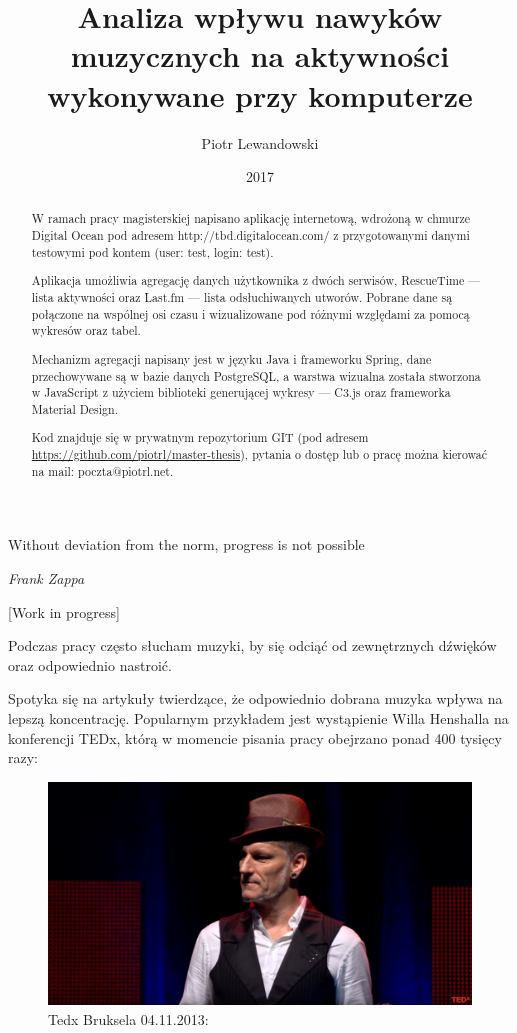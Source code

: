 \documentclass[brudnopis]{xmgr}
\author   {Piotr Lewandowski}
\title    {Analiza wpływu nawyków muzycznych na aktywności wykonywane przy komputerze}
\date     {2017}
\begin{document}
\begin{abstract}
    W ramach pracy magisterskiej napisano aplikację internetową,
    wdrożoną w chmurze Digital Ocean pod adresem http://tbd.digitalocean.com/
    z przygotowanymi danymi testowymi pod kontem (user: test, login: test).

    Aplikacja umożliwia agregację danych użytkownika z dwóch serwisów,
    RescueTime — lista aktywności oraz
    Last.fm — lista odsłuchiwanych utworów.
    Pobrane dane są połączone na wspólnej osi czasu i wizualizowane pod różnymi względami za pomocą wykresów oraz tabel.

    Mechanizm agregacji napisany jest w języku Java i frameworku Spring,
    dane przechowywane są w bazie danych PostgreSQL,
    a warstwa wizualna została stworzona w JavaScript
    z użyciem biblioteki generującej wykresy — C3.js
    oraz frameworka Material Design.

    Kod znajduje się w prywatnym repozytorium GIT (pod adresem \url{https://github.com/piotrl/master-thesis}),
    pytania o dostęp lub o pracę można kierować na mail: poczta@piotrl.net.
\end{abstract}


\maketitle

\introduction

\epigraph{Without deviation from the norm, progress is not possible}{\textit{Frank Zappa}}

[Work in progress]

Podczas pracy często słucham muzyki, by się odciąć od zewnętrznych dźwięków oraz odpowiednio nastroić.

Spotyka się na artykuły twierdzące, że odpowiednio dobrana muzyka wpływa na lepszą koncentrację.
Popularnym przykładem jest wystąpienie Willa Henshalla na konferencji TEDx,
którą w momencie pisania pracy obejrzano ponad 400 tysięcy razy:

\begin{figure}
  \includegraphics[width=\linewidth]{fig/tedx-will-hensell.png}
  \caption{Tedx Bruksela 04.11.2013: }
  \label{fig:Tedx Bruksela 04.11.2013: }
\end{figure}
\end{document}
